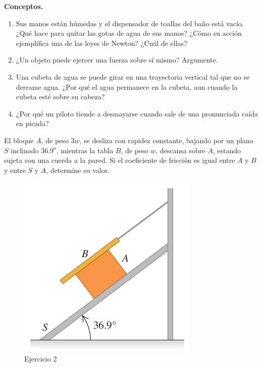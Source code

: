 \begin{mdframed}[style=warning]
	\begin{ejercicio}
		\textbf{Conceptos.}
		\begin{enumerate}
			\item Sus manos están húmedas y el dispensador de toallas del baño está vacío. ¿Qué hace para quitar las gotas de agua de sus manos? ¿Cómo su acción ejemplifica una de las leyes de Newton? ¿Cuál de ellas?
			\item ¿Un objeto puede ejercer una fuerza sobre sí mismo? Argumente.
			\item Una cubeta de agua se puede girar en una trayectoria vertical tal que no se derrame agua. ¿Por qué el agua permanece en la cubeta, aun cuando la cubeta esté sobre su cabeza?
			\item ¿Por qué un piloto tiende a desmayarse cuando sale de una pronunciada caída en picada?
		\end{enumerate}
	\end{ejercicio}
\end{mdframed}





\begin{mdframed}[style=warning]
	\begin{ejercicio}
		El bloque $A$, de peso $3w$, se desliza con rapidez constante, bajando por un plano $S$ inclinado $36.9^o$, mientras la tabla $B$, de peso $w$, descansa sobre $A$, estando sujeta con una cuerda a la pared. Si el coeficiente de fricción es igual entre $A$ y $B$ y entre $S$ y $A$, determine su valor.
		\begin{figure}[H]
			\centering
			\includegraphics[scale=0.35]{./img/599.png}
			\caption{Ejercicio 2}
			\label{599}
		\end{figure}
	\end{ejercicio}
\end{mdframed}







